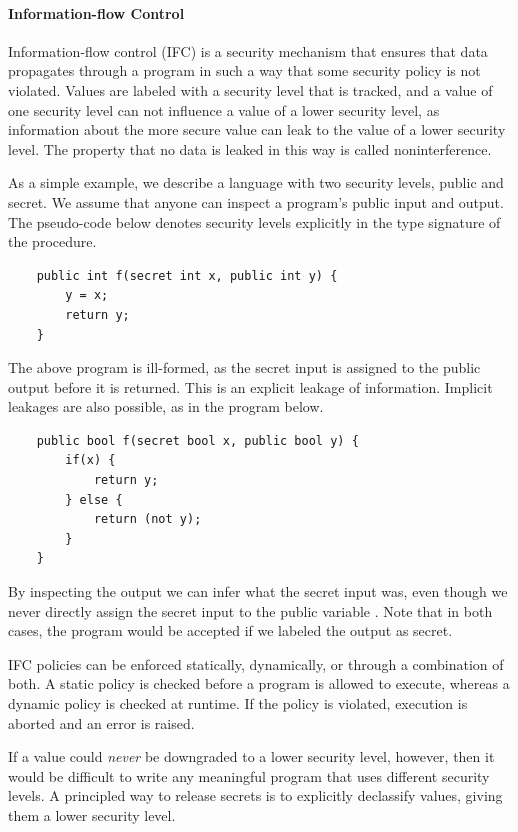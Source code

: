 \paragraph{Information-flow Control}

Information-flow control \cite{DBLP:series/natosec/HedinS12} (IFC) is a security mechanism that ensures that data propagates
through a program in such a way that some security policy is not violated. Values are labeled with a security level that is
tracked, and a value of one security level can not influence a value of a lower security level, as information
about the more secure value can leak to the value of a lower security level. The property that no data is leaked in this way is
called noninterference.

As a simple example, we describe a language with two security levels, public and secret. We assume that anyone can inspect
a program's public input and output. The pseudo-code below denotes security levels explicitly in the type signature
of the procedure.

\begin{verbatim}
    public int f(secret int x, public int y) {
        y = x;
        return y;
    }
\end{verbatim}

The above program is ill-formed, as the secret input is assigned to the public output before it is returned. This is an
explicit leakage of information. Implicit leakages are also possible, as in the program below.

\begin{verbatim}
    public bool f(secret bool x, public bool y) {
        if(x) {
            return y;
        } else {
            return (not y);
        }
    }
\end{verbatim}

By inspecting the output we can infer what the secret input was, even though we never directly assign the secret input
to the public variable . Note that in both cases, the program would be accepted if we labeled the output as secret.

IFC policies can be enforced statically, dynamically, or through a combination of both. A static policy is checked before
a program is allowed to execute, whereas a dynamic policy is checked at runtime. If the policy is violated, execution
is aborted and an error is raised.

If a value could \textit{never} be downgraded to a lower security level, however, then it would be difficult to write any
meaningful program that uses different security levels. A principled way to release secrets is to explicitly declassify values,
giving them a lower security level.


